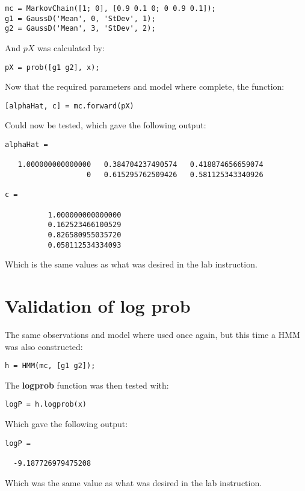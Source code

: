 \documentclass[]{article}
\begin{document}
\begin{verbatim}
mc = MarkovChain([1; 0], [0.9 0.1 0; 0 0.9 0.1]);
g1 = GaussD('Mean', 0, 'StDev', 1);
g2 = GaussD('Mean', 3, 'StDev', 2);
\end{verbatim}

And \(pX\) was calculated by:

\begin{verbatim}
pX = prob([g1 g2], x);
\end{verbatim}

Now that the required parameters and model where complete, the function:

\begin{verbatim}
[alphaHat, c] = mc.forward(pX)
\end{verbatim}

Could now be tested, which gave the following output:

\begin{verbatim}
alphaHat =

   1.000000000000000   0.384704237490574   0.418874656659074
                   0   0.615295762509426   0.581125343340926

c =

          1.000000000000000
          0.162523466100529
          0.826580955035720
          0.058112534334093
\end{verbatim}

Which is the same values as what was desired in the lab instruction.

\newpage

\section{Validation of log prob}\label{validation-of-log-prob}

The same observations and model where used once again, but this time a
HMM was also constructed:

\begin{verbatim}
h = HMM(mc, [g1 g2]);
\end{verbatim}

The \textbf{logprob} function was then tested with:

\begin{verbatim}
logP = h.logprob(x)
\end{verbatim}

Which gave the following output:

\begin{verbatim}
logP =

  -9.187726979475208
\end{verbatim}

Which was the same value as what was desired in the lab instruction.
\end{document}
